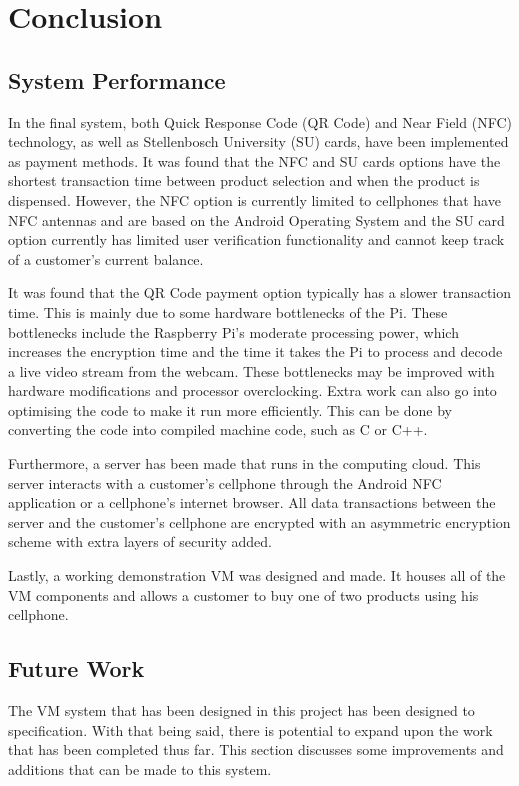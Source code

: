 \chapter{Conclusion}
\label{chap:7}

\section{System Performance}

In the final system, both Quick Response Code (QR Code) and Near Field (NFC)
technology, as well as Stellenbosch University (SU) cards, have been
implemented as payment methods. It was found that the NFC and SU cards options
have the shortest transaction time between product selection and when the
product is dispensed.
However, the NFC option is currently limited to cellphones that have NFC
antennas and are based on the Android Operating System and the SU card option
currently has limited user verification functionality and cannot keep track
of a customer's current balance.

It was found that the QR Code payment option typically has a slower transaction time. This
is mainly due to some hardware bottlenecks of the Pi. These bottlenecks include the
Raspberry Pi's moderate processing power, which increases the encryption time and the
time it takes the Pi to process and decode a live video stream from the webcam. These
bottlenecks may be improved with hardware modifications and processor overclocking. Extra
work can also go into optimising the code to make it run more efficiently. This can be
done by converting the code into compiled machine code, such as C or C++.

Furthermore, a server has been made that runs in the computing cloud. This server
interacts with a customer's cellphone through the Android NFC application or a
cellphone's internet browser. All data transactions between the server and the
customer's cellphone are encrypted with an asymmetric encryption scheme with
extra layers of security added.

Lastly, a working demonstration VM was designed and made. It houses all of
the VM components and allows a customer to buy one of two products using
his cellphone. 

\section{Future Work}

The VM system that has been designed in this project has been designed to
specification. With that being said, there is potential to expand upon the work
that has been completed thus far. This section discusses some improvements and additions
that can be made to this system.

